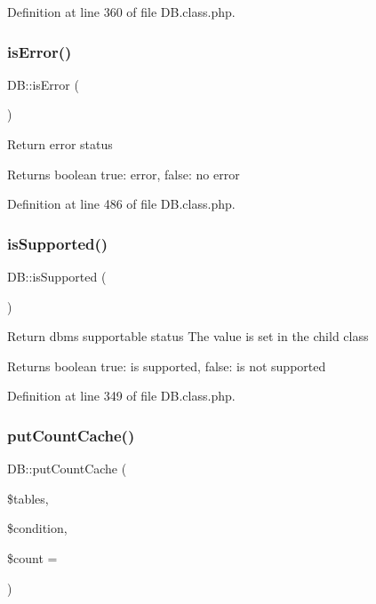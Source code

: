 Definition at line 360 of file D\+B.\+class.\+php.

\hypertarget{classDB_ab1433763c6378f1085606424a1bfe27c}{}\label{classDB_ab1433763c6378f1085606424a1bfe27c} 
\subsubsection{\texorpdfstring{is\+Error()}{isError()}}
{\footnotesize\ttfamily D\+B\+::is\+Error (\begin{DoxyParamCaption}{ }\end{DoxyParamCaption})}

Return error status \begin{DoxyReturn}{Returns}
boolean true\+: error, false\+: no error 
\end{DoxyReturn}


Definition at line 486 of file D\+B.\+class.\+php.

\hypertarget{classDB_a7517481bc9d24ad659f8d347688e481b}{}\label{classDB_a7517481bc9d24ad659f8d347688e481b} 
\subsubsection{\texorpdfstring{is\+Supported()}{isSupported()}}
{\footnotesize\ttfamily D\+B\+::is\+Supported (\begin{DoxyParamCaption}{ }\end{DoxyParamCaption})}

Return dbms supportable status The value is set in the child class \begin{DoxyReturn}{Returns}
boolean true\+: is supported, false\+: is not supported 
\end{DoxyReturn}


Definition at line 349 of file D\+B.\+class.\+php.

\hypertarget{classDB_a90771d4eaa0ff60a1ddbeb338f2ab801}{}\label{classDB_a90771d4eaa0ff60a1ddbeb338f2ab801} 
\subsubsection{\texorpdfstring{put\+Count\+Cache()}{putCountCache()}}
{\footnotesize\ttfamily D\+B\+::put\+Count\+Cache (\begin{DoxyParamCaption}\item[{}]{\$tables,  }\item[{}]{\$condition,  }\item[{}]{\$count = {} }\end{DoxyParamCaption})}

